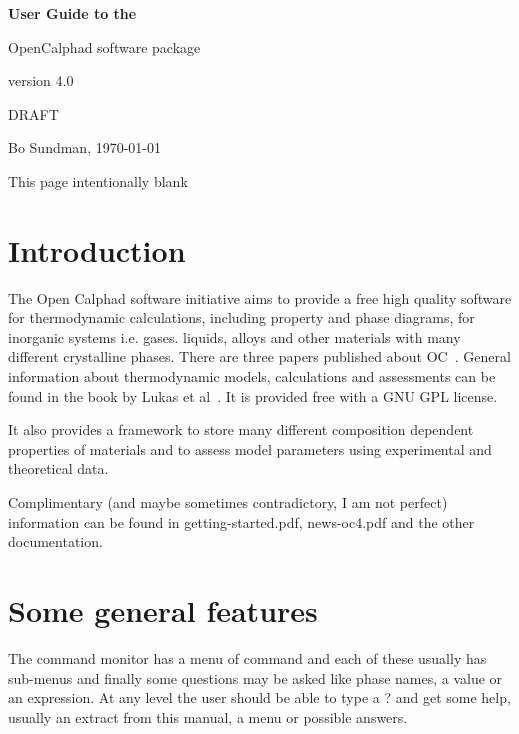 \documentclass[12pt]{article}
\begin{document}
\begin{center}

{\Huge \bf User Guide to the 

OpenCalphad software package

version 4.0

}

\bigskip

DRAFT

Bo Sundman, \today

\end{center}

\newpage

This page intentionally blank

\newpage

\tableofcontents

\newpage

\section{Introduction}

The Open Calphad software initiative aims to provide a free high
quality software for thermodynamic calculations, including property
and phase diagrams, for inorganic systems i.e.  gases. liquids, alloys
and other materials with many different crystalline phases.  There are
three papers published about OC~\cite{15Sun1,15Sun2,16Sun}.  General
information about thermodynamic models, calculations and assessments
can be found in the book by Lukas et al~\cite{07Luk}.  It is provided
free with a GNU GPL license.

It also provides a framework to store many different composition
dependent properties of materials and to assess model parameters using
experimental and theoretical data.  

Complimentary (and maybe sometimes contradictory, I am not perfect)
information can be found in getting-started.pdf, news-oc4.pdf and the
other documentation.

\section{Some general features}

The command monitor has a menu of command and each of these usually
has sub-menus and finally some questions may be asked like phase names,
a value or an expression.  At any level the user should be able to
type a ? and get some help, usually an extract from this manual, a
menu or possible answers.
\end{document}
